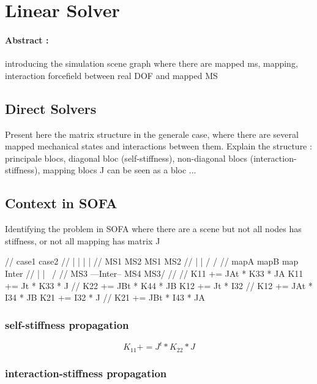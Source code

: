 \documentclass[a4paper,10pt]{article}
\begin{document}
\section{Linear Solver}
\paragraph{Abstract : }
introducing the simulation scene graph where there are mapped ms, mapping, interaction forcefield between real DOF and mapped MS

\subsection{Direct Solvers }
Present here the matrix structure in the generale case, where there are several mapped mechanical states and interactions between them. Explain the structure : principale blocs, diagonal bloc (self-stiffness), non-diagonal blocs (interaction-stiffness), mapping blocs J can be seen as a bloc ...
\subsection{Context in SOFA }
Identifying the problem in SOFA where there are a scene but not all nodes has stiffness, or not all mapping has matrix J

//           case1                                           case2
//      |               |                                  |       |
//     MS1             MS2                                MS1     MS2
//      |               |                                 /      /
//     mapA            mapB                             map   Inter
//      |               |                                 \   /
//     MS3 ---Inter--  MS4                                MS3/
//
//    K11 += JAt * K33 * JA                         K11 += Jt * K33 * J
//    K22 += JBt * K44 * JB                         K12 += Jt * I32
//    K12 += JAt * I34 * JB                         K21 +=      I32 * J
//    K21 += JBt * I43 * JA
\subsubsection{self-stiffness propagation }
\[
 K_{11} += J^t * K_{22} * J
\]
\subsubsection{interaction-stiffness propagation }
\end{document}
